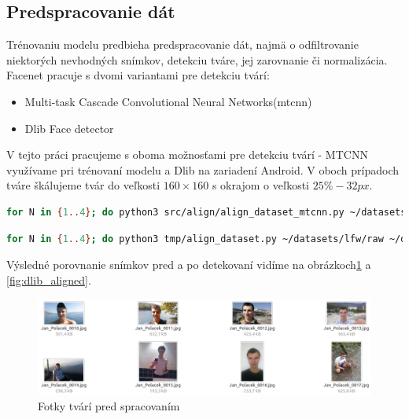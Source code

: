 \subsection{Predspracovanie dát}
Trénovaniu modelu predbieha predspracovanie dát, najmä o odfiltrovanie niektorých nevhodných snímkov, detekciu tváre, jej zarovnanie či normalizácia.
Facenet \cite{davidsan26} pracuje s dvomi variantami pre detekciu tvárí:

\begin{itemize}
	\item Multi-task Cascade Convolutional Neural Networks(\acrshort{mtcnn})
	\item Dlib Face detector
\end{itemize}

\indent V tejto práci pracujeme s oboma možnosťami pre detekciu tvárí - MTCNN využívame pri trénovaní modelu a Dlib na zariadení Android.
V oboch prípadoch tváre škálujeme tvár do veľkosti $ 160 \times 160 $ s okrajom o veľkosti $ 25\% - 32px $.

\begin{lstlisting}[language=Bash, caption={Spustenie predspracovania tvárí pomocou MTCNN}]
for N in {1..4}; do python3 src/align/align_dataset_mtcnn.py ~/datasets/lfw/raw ~/datasets/lfw/alligned --image_size 160 --margin 32 --random_order --gpu_memory_fraction 0.25 & done~
\end{lstlisting}

\begin{lstlisting}[language=Bash, caption={Spustenie predspracovania tvárí pomocou Dlib}]
for N in {1..4}; do python3 tmp/align_dataset.py ~/datasets/lfw/raw ~/datasets/lfw/alligned_dlib --image_size 160 --margin 0.20 --dlib_face_predictor ~/models/dlib/shape_predictor_68_face_landmarks.dat & done
\end{lstlisting}

\indent Výsledné porovnanie snímkov pred a po detekovaní vidíme na obrázkoch\ref{fig:dlib_raw} a \ref{fig:dlib_aligned}.

\begin{figure}[H]
	\centering
	\includegraphics[width=1\linewidth]{img/dlib_raw}
	\caption{Fotky tvárí pred spracovaním}
	\label{fig:dlib_raw}
\end{figure}

